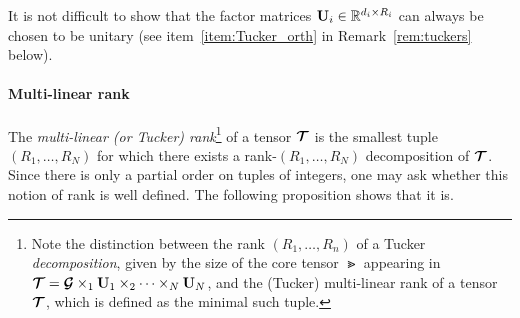 It is not difficult to show that the factor matrices
$\mathbf{U}_i \in \mathbb{R}^{d_i \times R_i}$ can always be chosen to be unitary (see
item~\ref{item:Tucker_orth} in Remark~\ref{rem:tuckers} below).


\paragraph{Multi-linear rank} The \emph{multi-linear (or Tucker) rank}\footnote{Note the distinction between the rank $(R_1,\dots,R_n)$ of a Tucker \emph{decomposition},
given by the size of the core tensor $\Gt$ appearing in
$\bm{\mathcal{T}} = \bm{\mathcal{G}} \times_1 \mathbf{U}_1 \times_2 \dots \times_N \mathbf{U}_N$, and the
(Tucker) multi-linear rank of a tensor $\bm{\mathcal{T}}$, which is defined as the
minimal such tuple.} of a tensor $\bm{\mathcal{T}}$ is the smallest tuple $(R_1,\dots,R_N)$
for which there exists a rank-$(R_1,\dots,R_N)$ decomposition of $\bm{\mathcal{T}}$. Since there is only 
a partial order on tuples of integers, one may ask whether this notion of rank is well defined. 
The following proposition shows that it is. 

